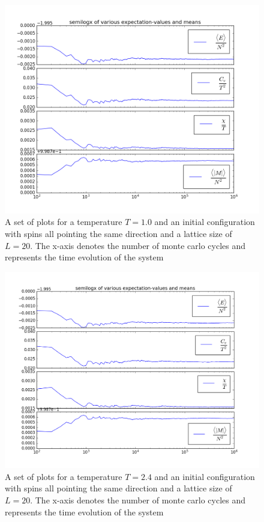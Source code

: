 \documentclass[12pt]{article}
\begin{document}
\begin{figure}[H]
\hspace*{-1cm}\includegraphics[scale=0.6]{exp_vals_ord_1.png}
\caption{A set of plots for a temperature $T = 1.0$ and an initial configuration with spins all pointing the same direction and a lattice size of $L = 20 $. The x-axis denotes the number of monte carlo cycles and represents the time evolution of the system}\label{fig:exp_t1_ord}
\end{figure}

\begin{figure}[H]
\hspace*{-1cm}\includegraphics[scale=0.55]{exp_vals_ord_2.png}
\caption{A set of plots for a temperature $T = 2.4$ and an initial configuration with spins all pointing the same direction and a lattice size of $L = 20 $. The x-axis denotes the number of monte carlo cycles and represents the time evolution of the system}\label{fig:exp_t2_ord}
\end{figure}
\end{document}
